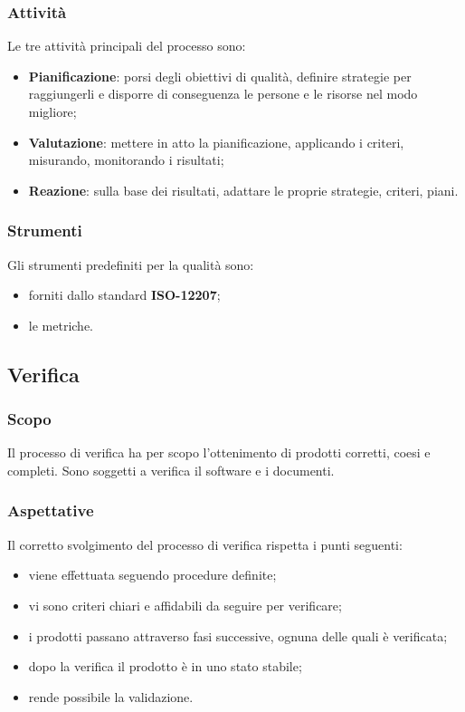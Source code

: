 	\subsubsection{Attività}
	Le tre attività principali del processo sono:
	\begin{itemize}
		\item \textbf{Pianificazione}: porsi degli obiettivi di qualità, definire strategie per raggiungerli e disporre di conseguenza le persone e le risorse nel modo migliore;
		\item \textbf{Valutazione}: mettere in atto la pianificazione, applicando i criteri, misurando, monitorando i risultati; 
		\item \textbf{Reazione}: sulla base dei risultati, adattare le proprie strategie, criteri, piani.
	\end{itemize}
	\subsubsection{Strumenti}
	Gli strumenti predefiniti per la qualità sono: 
	\begin{itemize}
		\item forniti dallo standard \textbf{ISO-12207};
		\item le metriche.
	\end{itemize} 
		
\subsection{Verifica}
	\subsubsection{Scopo}
	Il processo di verifica ha per scopo l'ottenimento di prodotti corretti, coesi e completi. Sono soggetti a verifica il software e i documenti. 
	\subsubsection{Aspettative}
	Il corretto svolgimento del processo di verifica rispetta i punti seguenti:	
	\begin{itemize}
		\item viene effettuata seguendo procedure definite;
		\item vi sono criteri chiari e affidabili da seguire per verificare;
		\item i prodotti passano attraverso fasi successive, ognuna delle quali è verificata;
		\item dopo la verifica il prodotto è in uno stato stabile;
		\item rende possibile la validazione.
	\end{itemize}
